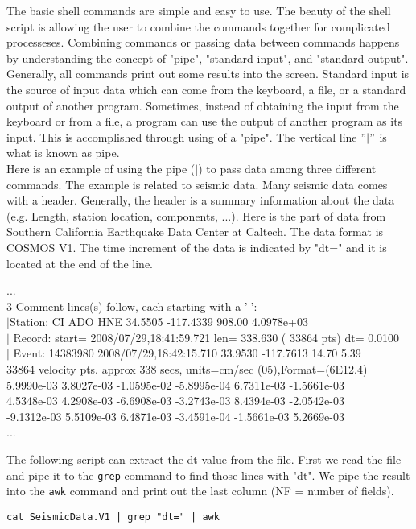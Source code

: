 \noindent
The basic shell commands are simple and easy to use. The beauty of the shell script is allowing the user to combine the commands together for complicated 
processeses. Combining commands or passing data between commands happens by understanding the concept of "pipe", "standard input", and "standard output". Generally, all commands print out some results into the screen. Standard input is the source of input data which can come from the keyboard, a file, or a standard output of another program. Sometimes, instead of obtaining the input from the keyboard or from a file, a program can use the output of another program as its input. This is accomplished through using of a "pipe". The vertical line $"\vert"$  is what is known as pipe. \\
\noindent
Here is an example of using the pipe ($\vert$) to pass data among three different commands. The example is related to seismic data. Many seismic data comes with a header. Generally, the header is a summary information about the data (e.g. Length, station location, components, ...). Here is the part of data from Southern California Earthquake Data Center at Caltech. The data format is COSMOS V1. The time increment of the data is indicated by "dt=" and it is located at the end of the line. \\



\begin{mdframed}[hidealllines=true,backgroundcolor=gray!20]
\begin{singlespace}
\fontsize{8pt}{1pt}
\textrm{
...\\
   3 Comment lines(s) follow, each starting with a '$\vert$':     \\                    
$\vert$Station: CI ADO HNE   34.5505   -117.4339 908.00   4.0978e+03 \\                 
$\vert$ Record: start= 2008/07/29,18:41:59.721 len=  338.630 ( 33864 pts) dt= 0.0100  \\
$\vert$ Event:  14383980 2008/07/29,18:42:15.710   33.9530   -117.7613  14.70  5.39   \\
   33864 velocity pts.     approx  338 secs, units=cm/sec (05),Format=(6E12.4)  \\
  5.9990e-03  3.8027e-03 -1.0595e-02 -5.8995e-04  6.7311e-03 -1.5661e-03    \\    
  4.5348e-03  4.2908e-03 -6.6908e-03 -3.2743e-03  8.4394e-03 -2.0542e-03     \\   
 -9.1312e-03  5.5109e-03  6.4871e-03 -3.4591e-04 -1.5661e-03  5.2669e-03   \\     
 ...
}
\end{singlespace}
\end{mdframed}
\noindent
The following script can extract the dt value from the file. First we read the file and pipe it to the \texttt{grep} command to find those lines with "dt". We pipe the result into the \texttt{awk} command and print out the last column (NF = number of fields). 

\begin{mdframed}[hidealllines=true,backgroundcolor=gray!20]
\fontsize{10pt}{1pt}
\texttt{cat SeismicData.V1 | grep "dt=" | awk }
\end{mdframed}



